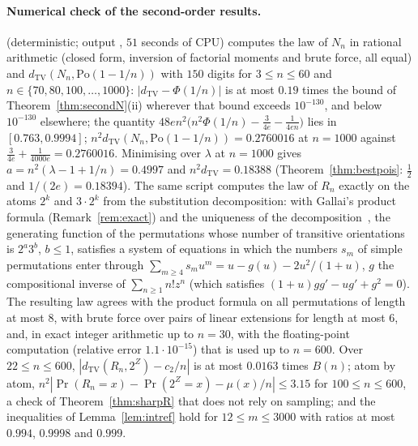 \paragraph{Numerical check of the second-order results.}
 (deterministic; output , $51$ seconds of CPU) computes the law of $N_n$ in rational arithmetic (closed form, inversion of factorial moments and brute force, all equal) and $d_{\mathrm{TV}}(N_n,\mathrm{Po}(1-1/n))$ with $150$ digits for $3\le n\le60$ and $n\in\{70,80,100,\dots,1000\}$: $|d_{\mathrm{TV}}-\Phi(1/n)|$ is at most $0.19$ times the bound of Theorem~\ref{thm:secondN}(ii) wherever that bound exceeds $10^{-130}$, and below $10^{-130}$ elsewhere; the quantity $48en^2\bigl(n^2\Phi(1/n)-\frac3{4e}-\frac1{4en}\bigr)$ lies in $[0.763,0.9994]$; $n^2d_{\mathrm{TV}}(N_n,\mathrm{Po}(1-1/n))=0.2760016$ at $n=1000$ against $\frac3{4e}+\frac1{4000e}=0.2760016$. Minimising over $\lambda$ at $n=1000$ gives $a=n^2(\lambda-1+1/n)=0.4997$ and $n^2d_{\mathrm{TV}}=0.18388$ (Theorem~\ref{thm:bestpois}: $\tfrac12$ and $1/(2e)=0.18394$). The same script computes the law of $R_n$ exactly on the atoms $2^k$ and $3\cdot2^k$ from the substitution decomposition: with Gallai's product formula (Remark~\ref{rem:exact}) and the uniqueness of the decomposition~\citep{albert2005}, the generating function of the permutations whose number of transitive orientations is $2^a3^b$, $b\le1$, satisfies a system of equations in which the numbers $s_m$ of simple permutations enter through $\sum_{m\ge4}s_mu^m=u-g(u)-2u^2/(1+u)$, $g$ the compositional inverse of $\sum_{n\ge1}n!z^n$ (which satisfies $(1+u)gg'-ug'+g^2=0$). The resulting law agrees with the product formula on all permutations of length at most $8$, with brute force over pairs of linear extensions for length at most $6$, and, in exact integer arithmetic up to $n=30$, with the floating-point computation (relative error $1.1\cdot10^{-15}$) that is used up to $n=600$. Over $22\le n\le600$, $|d_{\mathrm{TV}}(R_n,2^Z)-c_2/n|$ is at most $0.0163$ times $B(n)$; atom by atom, $n^2|\Pr(R_n=x)-\Pr(2^Z=x)-\mu(x)/n|\le3.15$ for $100\le n\le600$, a check of Theorem~\ref{thm:sharpR} that does not rely on sampling; and the inequalities of Lemma~\ref{lem:intref} hold for $12\le m\le3000$ with ratios at most $0.994$, $0.9998$ and $0.999$.
